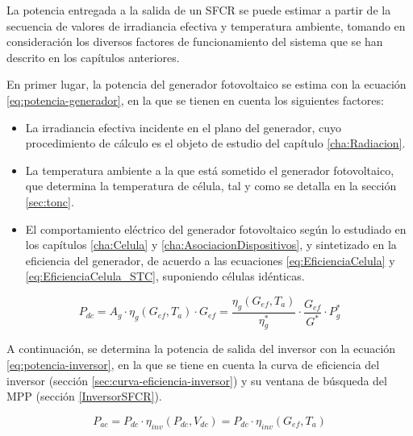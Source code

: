 La potencia entregada a la salida de un SFCR se puede estimar a partir de la secuencia de valores de irradiancia efectiva y temperatura ambiente, tomando en consideración los diversos factores de funcionamiento del sistema que se han descrito en los capítulos anteriores.

En primer lugar, la potencia del generador fotovoltaico se estima con la ecuación \ref{eq:potencia-generador}, en la que se tienen en cuenta los siguientes factores:
\begin{itemize}
\item La irradiancia efectiva incidente en el plano del generador,
  cuyo procedimiento de cálculo es el objeto de estudio del capítulo
  \ref{cha:Radiacion}.
\item La temperatura ambiente a la que está sometido el generador
  fotovoltaico, que determina la temperatura de célula, tal y como se
  detalla en la sección \ref{sec:tonc}.
\item El comportamiento eléctrico del generador fotovoltaico según lo
  estudiado en los capítulos \ref{cha:Celula} y
  \ref{cha:AsociacionDispositivos}, y sintetizado en la eficiencia del
  generador, de acuerdo a las ecuaciones \ref{eq:EficienciaCelula} y
  \ref{eq:EficienciaCelula_STC}, suponiendo células idénticas.
\end{itemize}

\begin{equation}
  P_{dc} = A_g \cdot \eta_g(G_{ef}, T_a) \cdot  G_{ef} = %
  \frac{\eta_g(G_{ef}, T_a)}{\eta_g^*} \cdot \frac{G_{ef}}{G^*} \cdot P_g^*
  \label{eq:potencia-generador}
\end{equation}

A continuación, se determina la potencia de salida del inversor con la ecuación \ref{eq:potencia-inversor}, en la que se tiene en cuenta la curva de eficiencia del inversor (sección \ref{sec:curva-eficiencia-inversor}) y su ventana de búsqueda del
MPP (sección \ref{InversorSFCR}).

\begin{equation}
  P_{ac} = P_{dc} \cdot \eta_{inv}(P_{dc}, V_{dc}) =  P_{dc} \cdot \eta_{inv}(G_{ef}, T_a)
  \label{eq:potencia-inversor}
\end{equation}

